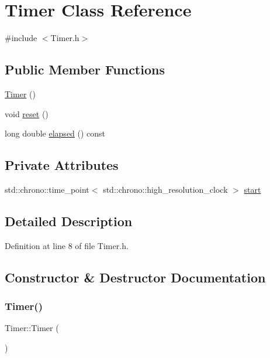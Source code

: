\hypertarget{class_timer}{}\section{Timer Class Reference}
\label{class_timer}


{\ttfamily \#include $<$Timer.\+h$>$}

\subsection*{Public Member Functions}
\begin{DoxyCompactItemize}
\item 
\mbox{\hyperlink{class_timer_a5f16e8da27d2a5a5242dead46de05d97}{Timer}} ()
\item 
void \mbox{\hyperlink{class_timer_a9020542d73357a4eef512eefaf57524b}{reset}} ()
\item 
long double \mbox{\hyperlink{class_timer_a4448fdb80f00982236dd8db16bf50fea}{elapsed}} () const
\end{DoxyCompactItemize}
\subsection*{Private Attributes}
\begin{DoxyCompactItemize}
\item 
std\+::chrono\+::time\+\_\+point$<$ std\+::chrono\+::high\+\_\+resolution\+\_\+clock $>$ \mbox{\hyperlink{class_timer_a8a51b74f2bfb71a5ec527d8954ed57d9}{start}}
\end{DoxyCompactItemize}


\subsection{Detailed Description}


Definition at line 8 of file Timer.\+h.



\subsection{Constructor \& Destructor Documentation}
\mbox{\label{class_timer_a5f16e8da27d2a5a5242dead46de05d97}} 
\subsubsection{\texorpdfstring{Timer()}{Timer()}}
{\footnotesize\ttfamily Timer\+::\+Timer (\begin{DoxyParamCaption}{ }\end{DoxyParamCaption})\hspace{0.3cm}{\ttfamily [inline]}}



